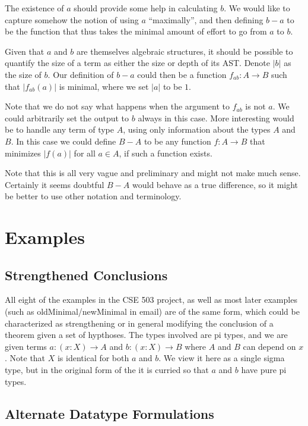 \documentclass[acmlarge,fleqn]{acmart}\settopmatter{}
\begin{document}
The existence of $a$ should provide some help in calculating $b$.  We
would like to capture somehow the notion of using $a$ ``maximally'',
and then defining $b-a$ to be the function that thus takes the minimal
amount of effort to go from $a$ to $b$.

Given that $a$ and $b$ are themselves algebraic structures, it should
be possible to quantify the size of a term as either the size or depth
of its AST.  Denote $|b|$ as the size of $b$.  Our definition of $b-a$
could then be a function $f_{ab} : A \to B$ such that $|f_{ab}(a)|$ is
minimal, where we set $|a|$ to be $1$.

Note that we do not say what happens when the argument to $f_{ab}$ is
not $a$.  We could arbitrarily set the output to $b$ always in this
case.  More interesting would be to handle any term of type $A$, using
only information about the types $A$ and $B$.  In this case we could
define $B - A$ to be any function $f : A \to B$ that minimizes
$|f(a)|$ for all $a \in A$, if such a function exists.

Note that this is all very vague and preliminary and might not make
much sense.  Certainly it seems doubtful $B - A$ would behave as a
true difference, so it might be better to use other notation and
terminology.

\section{Examples}

\subsection{Strengthened Conclusions}

All eight of the examples in the CSE 503 project, as well as most
later examples (such as oldMinimal/newMinimal in email) are of the
same form, which could be characterized as strengthening or in general
modifying the conclusion of a theorem given a set of hypthoses.  The
types involved are pi types, and we are given terms $a : (x : X) \to
A$ and $b : (x : X) \to B$ where $A$ and $B$ can depend on $x$.  Note
that $X$ is identical for both $a$ and $b$.  We view it here as a
single sigma type, but in the original form of the it is curried so
that $a$ and $b$ have pure pi types.



\subsection{Alternate Datatype Formulations}
\end{document}
